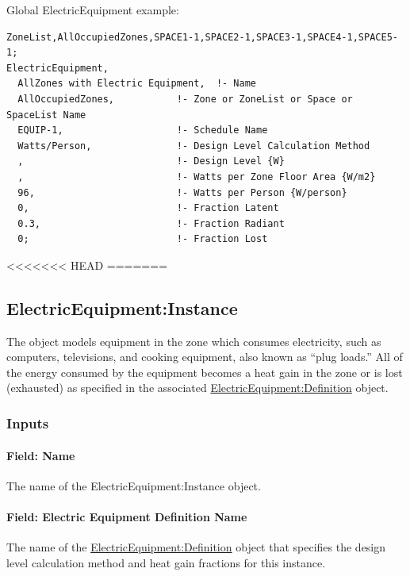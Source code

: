Global ElectricEquipment example:

\begin{lstlisting}
ZoneList,AllOccupiedZones,SPACE1-1,SPACE2-1,SPACE3-1,SPACE4-1,SPACE5-1;
ElectricEquipment,
  AllZones with Electric Equipment,  !- Name
  AllOccupiedZones,           !- Zone or ZoneList or Space or SpaceList Name
  EQUIP-1,                    !- Schedule Name
  Watts/Person,               !- Design Level Calculation Method
  ,                           !- Design Level {W}
  ,                           !- Watts per Zone Floor Area {W/m2}
  96,                         !- Watts per Person {W/person}
  0,                          !- Fraction Latent
  0.3,                        !- Fraction Radiant
  0;                          !- Fraction Lost
\end{lstlisting}

<<<<<<< HEAD
=======

\subsection{ElectricEquipment:Instance}\label{electricequipmentinstance}

The object models equipment in the zone which consumes electricity, such as computers, televisions, and cooking equipment, also known as ``plug loads.'' All of the energy consumed by the equipment becomes a heat gain in the zone or is lost (exhausted) as specified in the associated \hyperref[electricequipmentdefinition]{ElectricEquipment:Definition} object.

\subsubsection{Inputs}\label{inputs-3-019-ee-instance}

\paragraph{Field: Name}\label{field-name-3-017-ee-instance}

The name of the ElectricEquipment:Instance object.

\paragraph{Field: Electric Equipment Definition Name}\label{field-electric-equipment-definition-name}

The name of the \hyperref[electricequipmentdefinition]{ElectricEquipment:Definition} object that specifies the design level calculation method and heat gain fractions for this instance.

